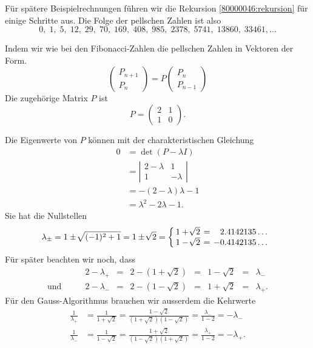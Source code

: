\begin{loesung}
Für spätere Beispielrechnungen führen wir die Rekursion
\eqref{80000046:rekursion}
für einige Schritte aus.
Die Folge der pellschen Zahlen ist also
\[
0,\;
1, \;
5,\;
12,\;
29,\;
70,\;
169,\;
408,\;
985,\;
2378,\;
5741,\;
13860,\;
33461,\dots
\]
\begin{teilaufgaben}
\item
Indem wir wie bei den Fibonacci-Zahlen die pellschen Zahlen in Vektoren
der Form.
\[
\begin{pmatrix}
P_{n+1}\\
P_n
\end{pmatrix}
=
P
\begin{pmatrix}
P_n\\
P_{n-1}
\end{pmatrix}
\]
Die zugehörige Matrix $P$ ist
\[
P
=
\begin{pmatrix}
2&1\\
1&0
\end{pmatrix}.
\]
\item
Die Eigenwerte von $P$ können mit der charakteristischen Gleichung
\begin{align*}
0
&=
\det(P-\lambda I)
\\
&=
\left|
\begin{matrix}
2-\lambda &     1    \\
    1     & -\lambda
\end{matrix}
\right|
\\
&=
-(2-\lambda)\lambda-1
\\
&=
\lambda^2-2\lambda -1.
\end{align*}
Sie hat die Nullstellen
\[
\lambda_{\pm}
=
1\pm\!\sqrt{(-1)^2+1}
=
1\pm\!\sqrt{2}
=
\left\{
\renewcommand{\arraycolsep}{2pt}
\begin{array}{ccl}
1+\!\sqrt{2} &=& \phantom{-}2.4142135\dots \\
1-\!\sqrt{2} &=&           -0.4142135\dots
\end{array}
\right.
\]
Für später beachten wir noch, dass 
\begin{equation}
\renewcommand{\arraycolsep}{2pt}
\begin{array}{cccccccl}
    & 2-\lambda_+ &=& 2-(1+\!\sqrt{2}) &=& 1-\!\sqrt{2} &=& \lambda_- \\
\text{und}\qquad
    & 2-\lambda_- &=& 2-(1-\!\sqrt{2}) &=& 1+\!\sqrt{2} &=& \lambda_+.
\end{array}
\label{80000046:lambda}
\end{equation}
Für den Gauss-Algorithmus brauchen wir ausserdem die Kehrwerte
\begin{align*}
\frac{1}{\lambda_+}
&=
\frac{1}{1+\!\sqrt{2}}
=
\frac{1-\!\sqrt{2}}{(1+\!\sqrt{2})(1-\!\sqrt{2})}
=
\frac{\lambda_-}{1-2}=-\lambda_-
\\
\frac{1}{\lambda_-}
&=
\frac{1}{1-\!\sqrt{2}}
=
\frac{1+\!\sqrt{2}}{(1-\!\sqrt{2})(1+\!\sqrt{2})}
=
\frac{\lambda_+}{1-2}=-\lambda_+.
\end{align*}


\end{teilaufgaben}
\end{loesung}
